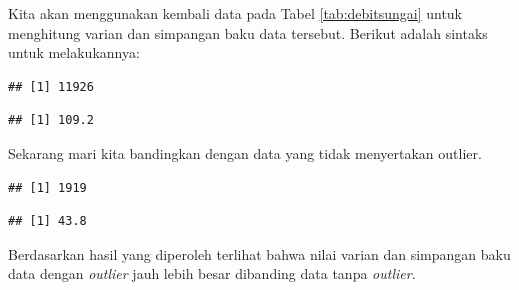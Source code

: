 \documentclass[]{book}
\newenvironment{Shaded}{\begin{snugshade}}{\end{snugshade}}
\newcommand{\KeywordTok}[1]{\textcolor[rgb]{0.13,0.29,0.53}{\textbf{#1}}}
\newcommand{\CommentTok}[1]{\textcolor[rgb]{0.56,0.35,0.01}{\textit{#1}}}
\newcommand{\OperatorTok}[1]{\textcolor[rgb]{0.81,0.36,0.00}{\textbf{#1}}}
\newcommand{\NormalTok}[1]{#1}
\begin{document}
Kita akan menggunakan kembali data pada Tabel \ref{tab:debitsungai}
untuk menghitung varian dan simpangan baku data tersebut. Berikut adalah
sintaks untuk melakukannya:

\begin{Shaded}
\end{Shaded}

\begin{verbatim}
## [1] 11926
\end{verbatim}

\begin{Shaded}
\end{Shaded}

\begin{verbatim}
## [1] 109.2
\end{verbatim}

Sekarang mari kita bandingkan dengan data yang tidak menyertakan
outlier.

\begin{Shaded}
\end{Shaded}

\begin{verbatim}
## [1] 1919
\end{verbatim}

\begin{Shaded}
\end{Shaded}

\begin{verbatim}
## [1] 43.8
\end{verbatim}

Berdasarkan hasil yang diperoleh terlihat bahwa nilai varian dan
simpangan baku data dengan \emph{outlier} jauh lebih besar dibanding
data tanpa \emph{outlier}.
\end{document}
